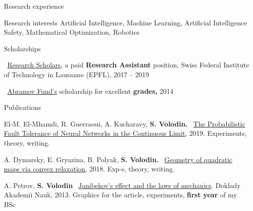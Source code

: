 \documentclass{resume} %
\newcommand{\mylink}{{\color{gray}\faExternalLink}}
\begin{document}
\begin{rSection}{Research experience}
\end{rSection}

\begin{rSection}{Research interests}
	Artificial Intelligence, Machine Learning, Artificial Intelligence Safety, Mathematical Optimization, Robotics %
\end{rSection}

\begin{rSection}{Scholarships}
	\vspace{-1em}
	\item \mylink~\href{https://ic.epfl.ch/ResearchScholars}{Research Scholars}, a paid {\bf Research Assistant} position, Swiss Federal Institute of Technology in Lausanne (EPFL), 2017 -- 2019
	\item \mylink~\href{http://phystech-foundation.org/}{Abramov Fund's} scholarship for excellent {\bf grades,} 2014
\end{rSection}

\newpage

\begin{rSection}{Publications}
\vspace{-1em}
\item El-M. El-Mhamdi, R. Guerraoui, A. Kucharavy, {\bf \color{grayheading} S. Volodin.} \mylink~\href{https://arxiv.org/abs/1902.01686}{The Probabilistic Fault Tolerance of Neural Networks in the Continuous Limit}, 2019. Experiments, theory,  writing. %
\item A. Dymarsky, E. Gryazina, B. Polyak, {\bf \color{grayheading} S. Volodin.} \mylink~\href{https://arxiv.org/pdf/1810.00896.pdf}{Geometry of quadratic maps via convex relaxation}, 2018. Exp-s, theory, writing.%
\item A. Petrov, {\bf \color{grayheading} S. Volodin} \mylink~\href{https://link.springer.com/article/10.1134/S1028335813080041}{Janibekov's effect and the laws of mechanics}. Doklady Akademii Nauk, 2013. Graphics for the article, experiments, {\bf first year} of my BSc
\end{rSection}
\end{document}
